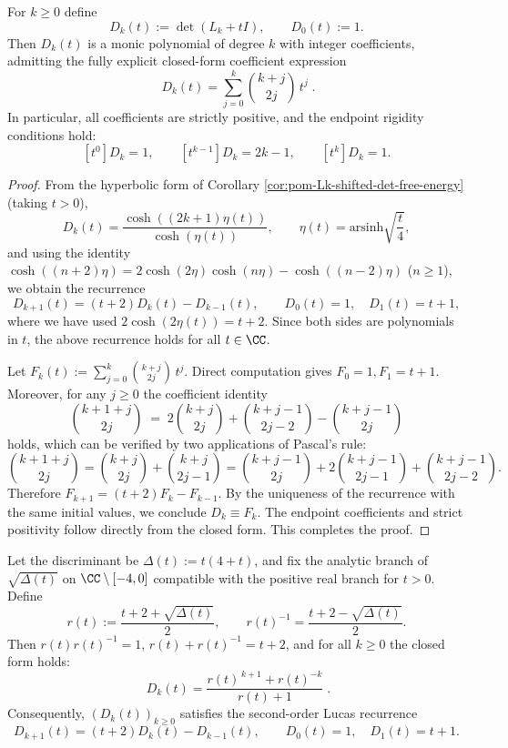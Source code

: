 
\begin{proposition}\label{prop:pom-Lk-det-coeff-binomial}
For \(k\ge 0\) define
\[
D_k(t):=\det(L_k+tI),
\qquad
D_0(t):=1.
\]
Then \(D_k(t)\) is a monic polynomial of degree \(k\) with integer coefficients, admitting the fully explicit closed-form coefficient expression
\[
\boxed{\;
D_k(t)=\sum_{j=0}^{k}\binom{k+j}{2j}\,t^{j}\; }.
\]
In particular, all coefficients are strictly positive, and the endpoint rigidity conditions hold:
\[
[t^0]D_k=1,\qquad [t^{k-1}]D_k=2k-1,\qquad [t^{k}]D_k=1.
\]
\end{proposition}

\begin{proof}
From the hyperbolic form of Corollary \ref{cor:pom-Lk-shifted-det-free-energy} (taking \(t>0\)),
\[
D_k(t)=\frac{\cosh((2k+1)\eta(t))}{\cosh(\eta(t))},
\qquad
\eta(t)=\mathrm{arsinh}\sqrt{\frac{t}{4}},
\]
and using the identity
\(
\cosh((n+2)\eta)=2\cosh(2\eta)\cosh(n\eta)-\cosh((n-2)\eta)
\)
(\(n\ge 1\)), we obtain the recurrence
\[
D_{k+1}(t)=(t+2)D_k(t)-D_{k-1}(t),
\qquad
D_0(t)=1,\quad D_1(t)=t+1,
\]
where we have used \(2\cosh(2\eta(t))=t+2\).
Since both sides are polynomials in \(t\), the above recurrence holds for all \(t\in\CC\).
\par
Let
\(
F_k(t):=\sum_{j=0}^{k}\binom{k+j}{2j}\,t^j
\).
Direct computation gives \(F_0=1,F_1=t+1\).
Moreover, for any \(j\ge 0\) the coefficient identity
\[
\binom{k+1+j}{2j}
\;=\;
2\binom{k+j}{2j}+\binom{k+j-1}{2j-2}-\binom{k+j-1}{2j}
\]
holds, which can be verified by two applications of Pascal's rule:
\[
\binom{k+1+j}{2j}
=\binom{k+j}{2j}+\binom{k+j}{2j-1}
=\binom{k+j-1}{2j}+2\binom{k+j-1}{2j-1}+\binom{k+j-1}{2j-2}.
\]
Therefore \(F_{k+1}=(t+2)F_k-F_{k-1}\).
By the uniqueness of the recurrence with the same initial values, we conclude \(D_k\equiv F_k\).
The endpoint coefficients and strict positivity follow directly from the closed form. This completes the proof.
\end{proof}

\begin{corollary}\label{cor:pom-Lk-det-lucas-unit}
Let the discriminant be \(\Delta(t):=t(4+t)\), and fix the analytic branch of \(\sqrt{\Delta(t)}\) on \(\CC\setminus[-4,0]\) compatible with the positive real branch for \(t>0\).
Define
\[
r(t):=\frac{t+2+\sqrt{\Delta(t)}}{2},
\qquad
r(t)^{-1}=\frac{t+2-\sqrt{\Delta(t)}}{2}.
\]
Then \(r(t)r(t)^{-1}=1\), \(r(t)+r(t)^{-1}=t+2\), and for all \(k\ge 0\) the closed form holds:
\[
\boxed{\;
D_k(t)=\frac{r(t)^{\,k+1}+r(t)^{-k}}{r(t)+1}\; }.
\]
Consequently, \((D_k(t))_{k\ge 0}\) satisfies the second-order Lucas recurrence
\[
D_{k+1}(t)=(t+2)D_k(t)-D_{k-1}(t),
\qquad
D_0(t)=1,\quad D_1(t)=t+1.
\]
\end{corollary}

